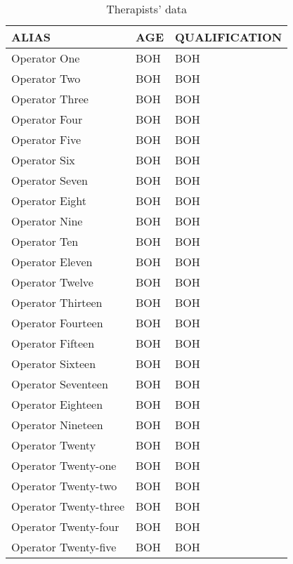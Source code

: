 \begin{table}[H]
\centering
\tabulinesep=1.2mm
\begin{tabu} {|B|A|C|}
\hline
       \textbf{ALIAS} & \textbf{AGE} & \textbf{QUALIFICATION}\\\hline
       Operator One & BOH & BOH\\\hline
       Operator Two & BOH & BOH\\\hline
     Operator Three & BOH & BOH\\\hline
     Operator Four & BOH & BOH\\\hline
     Operator Five & BOH & BOH\\\hline
     Operator Six & BOH & BOH\\\hline
     Operator Seven & BOH & BOH\\\hline
     Operator Eight & BOH & BOH\\\hline
     Operator Nine & BOH & BOH\\\hline
     Operator Ten & BOH & BOH\\\hline
     Operator Eleven & BOH & BOH\\\hline
     Operator Twelve & BOH & BOH\\\hline
     Operator Thirteen & BOH & BOH\\\hline
     Operator Fourteen & BOH & BOH\\\hline
     Operator Fifteen & BOH & BOH\\\hline
     Operator Sixteen & BOH & BOH\\\hline
     Operator Seventeen & BOH & BOH\\\hline
     Operator Eighteen & BOH & BOH\\\hline
     Operator Nineteen & BOH & BOH\\\hline
     Operator Twenty & BOH & BOH\\\hline
     Operator Twenty-one & BOH & BOH\\\hline
     Operator Twenty-two & BOH & BOH\\\hline
     Operator Twenty-three & BOH & BOH\\\hline
     Operator Twenty-four & BOH & BOH\\\hline
     Operator Twenty-five & BOH & BOH\\\hline     
 \end{tabu}
 \caption{Therapists' data \label{table:datat}}
\end{table}
